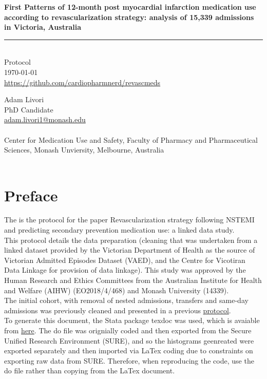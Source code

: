 \documentclass[11pt]{article}
\newcommand{\thedate}{\today}
\begin{document}
\begin{titlepage}
  \begin{flushright}
        \Huge
		\textbf{First Patterns of 12-month post myocardial infarction medication use according to revascularization strategy: analysis of 15,339 admissions in Victoria, Australia }
\color{violet}
\rule{16cm}{2mm} \\
\Large
\color{black}
Protocol \\
\thedate \\
\color{blue}
\url{https://github.com/cardiopharmnerd/revascmeds} \\
\color{black}
		\vfill
	\end{flushright}
		\Large
\noindent
Adam Livori \\
PhD Candidate \\
\color{blue}
\href{mailto:adam.livori1@monash.edu}{adam.livori1@monash.edu} \\
\color{black}
\\
Center for Medication Use and Safety, Faculty of Pharmacy and Pharmaceutical Sciences, Monash Unviersity, Melbourne, Australia \\
\\
\end{titlepage}

\pagebreak
\tableofcontents
\pagebreak
\listoffigures
\pagebreak

\pagebreak
\section{Preface}

The is the protocol for the paper Revascularization strategy following NSTEMI and predicting secondary prevention medication use: a linked data study. \\
This protocol details the data preparation (cleaning that was undertaken from a linked dataset provided by the Victorian Department of Health as the source of Victorian Admitted Episodes Dataset (VAED), and the Centre for Vicotiran Data Linkage for provision of data linkage). This study was approved by the Human Research and Ethics Committees from the Australian Institute for Health and Welfare (AIHW) (EO2018/4/468) and Monash University (14339). \\
The initial cohort, with removal of nested admissions, transfers and same-day admissions was previously cleaned and presented in a previous \color{blue} \href{https://github.com/cardiopharmnerd/medsremote}{protocol}.\\
\color{black} To generate this document, the Stata package texdoc was used, which is avaiable from \color{blue} \href{http://repec.sowi.unibe.ch/stata/texdoc/}{here}. \color{black} The do file was orignially coded and then exported from the Secure Unified Research Environment (SURE), and so the histograms geenreated were exported separately and then imported via LaTex coding due to constraints on exporting raw data from SURE. Therefore, when reproducing the code, use the do file rather than copying from the LaTex document. 
\end{document}
